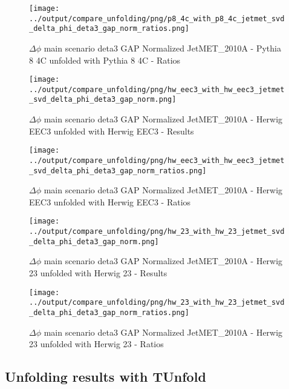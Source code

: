 \documentclass[11pt]{book}
\begin{document}
\begin{figure}[ht]
\centering
\texttt{[image: ../output/compare\_unfolding/png/p8\_4c\_with\_p8\_4c\_jetmet\_svd\_delta\_phi\_deta3\_gap\_norm\_ratios.png]}
\caption{$\Delta\phi$ main scenario deta3 GAP Normalized JetMET\_2010A - Pythia 8 4C unfolded with Pythia 8 4C - Ratios}
\label{p8_p8_jetmet_svd_delta_phi_deta3_gap_norm_b}
\end{figure}

\begin{figure}[ht]
\centering
\texttt{[image: ../output/compare\_unfolding/png/hw\_eec3\_with\_hw\_eec3\_jetmet\_svd\_delta\_phi\_deta3\_gap\_norm.png]}
\caption{$\Delta\phi$ main scenario deta3 GAP Normalized JetMET\_2010A - Herwig EEC3 unfolded with Herwig EEC3 - Results}
\label{hw_eec3_hw_eec3_jetmet_svd_delta_phi_deta3_gap_norm_a}
\end{figure}

\begin{figure}[ht]
\centering
\texttt{[image: ../output/compare\_unfolding/png/hw\_eec3\_with\_hw\_eec3\_jetmet\_svd\_delta\_phi\_deta3\_gap\_norm\_ratios.png]}
\caption{$\Delta\phi$ main scenario deta3 GAP Normalized JetMET\_2010A - Herwig EEC3 unfolded with Herwig EEC3 - Ratios}
\label{hw_eec3_hw_eec3_jetmet_svd_delta_phi_deta3_gap_norm_b}
\end{figure}

\begin{figure}[ht]
\centering
\texttt{[image: ../output/compare\_unfolding/png/hw\_23\_with\_hw\_23\_jetmet\_svd\_delta\_phi\_deta3\_gap\_norm.png]}
\caption{$\Delta\phi$ main scenario deta3 GAP Normalized JetMET\_2010A - Herwig 23 unfolded with Herwig 23 - Results}
\label{hw_23_hw_23_jetmet_svd_delta_phi_deta3_gap_norm_a}
\end{figure}

\begin{figure}[ht]
\centering
\texttt{[image: ../output/compare\_unfolding/png/hw\_23\_with\_hw\_23\_jetmet\_svd\_delta\_phi\_deta3\_gap\_norm\_ratios.png]}
\caption{$\Delta\phi$ main scenario deta3 GAP Normalized JetMET\_2010A - Herwig 23 unfolded with Herwig 23 - Ratios}
\label{hw_23_hw_23_jetmet_svd_delta_phi_deta3_gap_norm_b}
\end{figure}


\clearpage
\subsection{Unfolding results with TUnfold}
\end{document}
